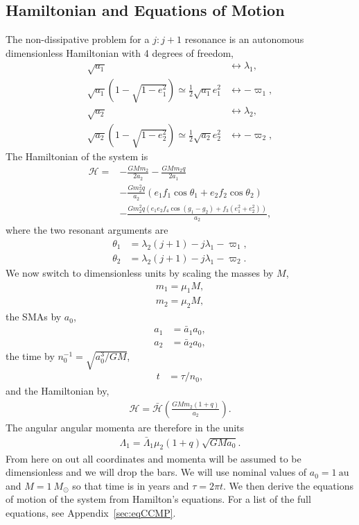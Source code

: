 \documentclass[usenatbib,twocolumn]{mnras}
\begin{document}
\subsection{Hamiltonian and Equations of Motion}
The non-dissipative problem for a $j:j+1$ resonance is an autonomous dimensionless Hamiltonian with 4 degrees of freedom,
\begin{align}
    \sqrt{a_1}&\leftrightarrow \lambda_1,\\
    \sqrt{a_1}(1-\sqrt{1-e_1^2})\simeq\frac12\sqrt{a_1}e_1^2&\leftrightarrow -\varpi_1,\\
    \sqrt{a_2}&\leftrightarrow \lambda_2,\\
    \sqrt{a_2}(1-\sqrt{1-e_2^2})\simeq\frac12\sqrt{a_2}e_2^2&\leftrightarrow -\varpi_2,
\end{align}
The Hamiltonian of the system is
\begin{align}
    \label{eq:CCMP_H}
    \mathcal H=
    &- \frac{G M m_{2}}{2 a_{2}} - \frac{G M m_{2} q}{2 a_{1}} \\
    &- \frac{G m_{2}^{2} q}{a_{2}} \left(e_{1} f_{1} \cos{\theta_1} + e_{2} f_{2} \cos{\theta_2}\right) \\
    &- \frac{G m_{2}^{2} q \left(e_{1} e_{2} f_{4} \cos{\left(g_{1} - g_{2} \right)} + f_{3} \left(e_{1}^{2} + e_{2}^{2}\right)\right)}{a_{2}},
\end{align}
where the two resonant arguments are
\begin{align}
    \theta_1 &=\lambda_{2} \left(j + 1\right) - j \lambda_{1}-\varpi_{1}, \\
    \theta_2 &= \lambda_{2} \left(j + 1\right)- j \lambda_{1}-\varpi_{2}.
\end{align}
We now switch to dimensionless units by scaling the masses by $M$,
\begin{align}
    m_1 = \mu_1 M,\\
    m_2 = \mu_2 M,
\end{align}
the SMAs by $a_0$,
\begin{align}
    a_1 &= \bar a_1a_0,\\
    a_2 &= \bar a_2a_0,
\end{align}
the time by $n_0^{-1} = \sqrt{a_0^{3}/GM}$,
\begin{align}
    t &= \tau/n_0,
\end{align}
and the Hamiltonian by,
\begin{align}
    \mathcal H = \bar{\mathcal{H}} \left(\frac{GMm_2(1+q)}{a_2}\right).
\end{align}
The angular angular momenta are therefore in the units
\begin{align}
    \Lambda_1 = \bar\Lambda_1 \mu_2(1+q)\sqrt{GMa_{0}}.
\end{align}
From here on out all coordinates and momenta will be assumed to be dimensionless and we will drop the bars.
We will use nominal values of $a_0=1~\mathrm{au}$ and $M=1~M_\odot$ so that time is in years and $\tau=2\pi t$.
We then derive the equations of motion of the system from Hamilton's equations. For a list of the full equations, see Appendix~\ref{sec:eqCCMP}.
\end{document}
